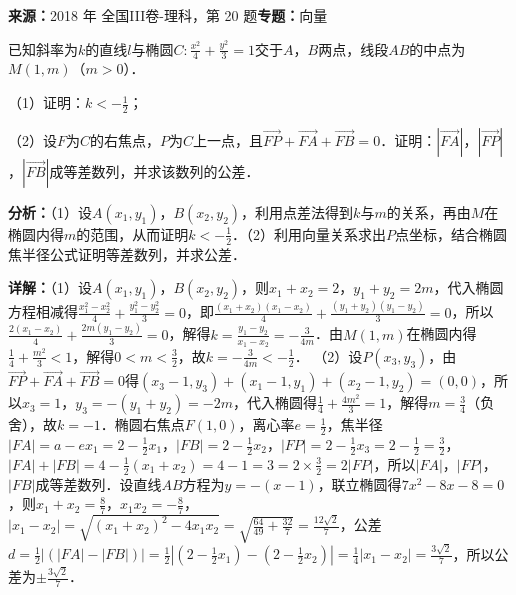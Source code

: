 \begin{question}[points=12]
\textbf{来源：}2018 年 全国III卷-理科，第 20 题\quad \textbf{专题：}向量\par
已知斜率为$k$的直线$l$与椭圆$C:\frac{x^2}{4}+\frac{y^2}{3}=1$交于$A$，$B$两点，线段$AB$的中点为$M(1,m)$（$m>0$）．

（1）证明：$k<-\frac{1}{2}$；

（2）设$F$为$C$的右焦点，$P$为$C$上一点，且$\overrightarrow{FP}+\overrightarrow{FA}+\overrightarrow{FB}=0$．证明：$|\overrightarrow{FA}|$，$|\overrightarrow{FP}|$，$|\overrightarrow{FB}|$成等差数列，并求该数列的公差．
\begin{solution}

\textbf{分析：}（1）设$A(x_1,y_1)$，$B(x_2,y_2)$，利用点差法得到$k$与$m$的关系，再由$M$在椭圆内得$m$的范围，从而证明$k<-\frac{1}{2}$．（2）利用向量关系求出$P$点坐标，结合椭圆焦半径公式证明等差数列，并求公差．

\textbf{详解：}（1）设$A(x_1,y_1)$，$B(x_2,y_2)$，则$x_1+x_2=2$，$y_1+y_2=2m$，代入椭圆方程相减得$\frac{x_1^2-x_2^2}{4}+\frac{y_1^2-y_2^2}{3}=0$，即$\frac{(x_1+x_2)(x_1-x_2)}{4}+\frac{(y_1+y_2)(y_1-y_2)}{3}=0$，所以$\frac{2(x_1-x_2)}{4}+\frac{2m(y_1-y_2)}{3}=0$，解得$k=\frac{y_1-y_2}{x_1-x_2}=-\frac{3}{4m}$．由$M(1,m)$在椭圆内得$\frac{1}{4}+\frac{m^2}{3}<1$，解得$0<m<\frac{3}{2}$，故$k=-\frac{3}{4m}<-\frac{1}{2}$．
（2）设$P(x_3,y_3)$，由$\overrightarrow{FP}+\overrightarrow{FA}+\overrightarrow{FB}=0$得$(x_3-1,y_3)+(x_1-1,y_1)+(x_2-1,y_2)=(0,0)$，所以$x_3=1$，$y_3=-(y_1+y_2)=-2m$，代入椭圆得$\frac{1}{4}+\frac{4m^2}{3}=1$，解得$m=\frac{3}{4}$（负舍），故$k=-1$．椭圆右焦点$F(1,0)$，离心率$e=\frac{1}{2}$，焦半径$|FA|=a-ex_1=2-\frac{1}{2}x_1$，$|FB|=2-\frac{1}{2}x_2$，$|FP|=2-\frac{1}{2}x_3=2-\frac{1}{2}=\frac{3}{2}$，$|FA|+|FB|=4-\frac{1}{2}(x_1+x_2)=4-1=3=2\times\frac{3}{2}=2|FP|$，所以$|FA|$，$|FP|$，$|FB|$成等差数列．设直线$AB$方程为$y=-(x-1)$，联立椭圆得$7x^2-8x-8=0$，则$x_1+x_2=\frac{8}{7}$，$x_1x_2=-\frac{8}{7}$，$|x_1-x_2|=\sqrt{(x_1+x_2)^2-4x_1x_2}=\sqrt{\frac{64}{49}+\frac{32}{7}}=\frac{12\sqrt{2}}{7}$，公差$d=\frac{1}{2}|(|FA|-|FB|)|=\frac{1}{2}|(2-\frac{1}{2}x_1)-(2-\frac{1}{2}x_2)|=\frac{1}{4}|x_1-x_2|=\frac{3\sqrt{2}}{7}$，所以公差为$\pm\frac{3\sqrt{2}}{7}$．
\end{solution}
\end{question}


